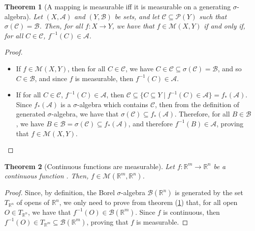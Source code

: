 \documentclass{article}
\newtheorem{theorem}{Theorem}[section]
\theoremstyle{definition}
\theoremstyle{remark}
\theoremstyle{example}
\theoremstyle{notation}
\theoremstyle{axiom}
\begin{document}
\begin{theorem}[A mapping is measurable iff it is measurable on a generating $\sigma$-algebra] \label{thm:measurable-iff-measurable-on-generating-sigma-algebra}%
		Let $(X, \mathcal{A})$ and $(Y, \mathcal{B})$ be sets, and let $\mathcal{C} \subseteq \mathcal{P}(Y)$ such that $\sigma(\mathcal{C}) = \mathcal{B}$. Then, for all $f : X \rightarrow Y$, we have that $f \in \mathcal{M}(X, Y)$ if and only if, for all $C \in \mathcal{C}$, $f^{-1}(C) \in \mathcal{A}$.
\end{theorem}

\begin{proof}~
		\begin{itemize}
				\item If $f \in \mathcal{M}(X, Y)$, then for all $C \in \mathcal{C}$, we have $C \in \mathcal{C} \subseteq \sigma(\mathcal{C}) = \mathcal{B}$, and so $C \in \mathcal{B}$, and since $f$ is measurable, then $f^{-1}(C) \in \mathcal{A}$.
				\item If for all $C \in \mathcal{C}$, $f^{-1}(C) \in \mathcal{A}$, then $\mathcal{C} \subseteq \{C \subseteq Y \mid f^{-1}(C) \in \mathcal{A}\} = f_*(\mathcal{A})$. Since $f_*(\mathcal{A})$ is a $\sigma$-algebra which contains $\mathcal{C}$, then from the definition of generated $\sigma$-algebra, we have that $\sigma(\mathcal{C}) \subseteq f_*(\mathcal{A})$. Therefore, for all $B \in \mathcal{B}$, we have $B \in \mathcal{B} = \sigma(\mathcal{C}) \subseteq f_*(\mathcal{A})$, and therefore $f^{-1}(B) \in \mathcal{A}$, proving that $f \in \mathcal{M}(X, Y)$.
		\end{itemize}
\end{proof}

\begin{theorem}[Continuous functions are measurable] \label{thm:continuous-measurable} %
		Let $f : \mathbb{R}^m \rightarrow \mathbb{R}^n$ be a continuous function . Then, $f \in \mathcal{M}(\mathbb{R}^m, \mathbb{R}^n)$.
\end{theorem}

\begin{proof}
		Since, by definition, the Borel $\sigma$-algebra $\mathcal{B}(\mathbb{R}^n)$ is generated by the set $T_{\mathbb{R}^n}$ of opens of $\mathbb{R}^n$, we only need to prove from theorem (\ref{thm:measurable-iff-measurable-on-generating-sigma-algebra}) that, for all open $O \in T_{\mathbb{R}^n}$, we have that $f^{-1}(O) \in \mathcal{B}(\mathbb{R}^m)$. Since $f$ is continuous, then $f^{-1}(O) \in T_{\mathbb{R}^m} \subseteq \mathcal{B}(\mathbb{R}^m)$, proving that $f$ is measurable.
\end{proof}
\end{document}
